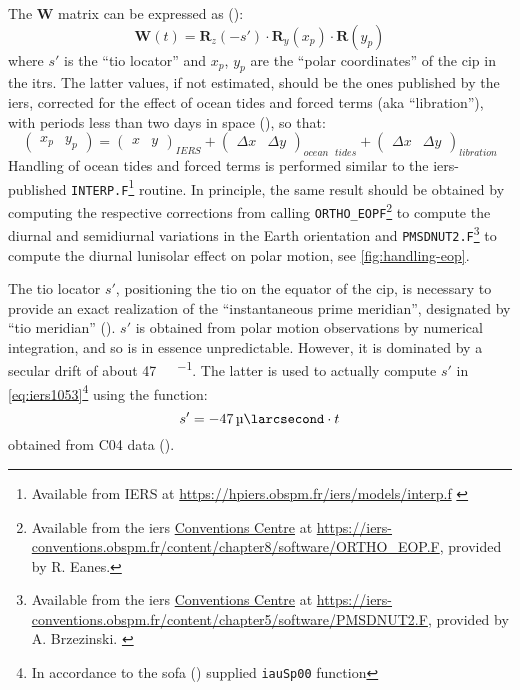 The $\bm{W}$ matrix can be expressed as (\cite{iers2010}):
\begin{equation}
    \bm{W}(t) = \bm{R}_z(-s') \cdot \bm{R}_y(x_p) \cdot \bm{R}(y_p)
    \label{eq:iers1053}
\end{equation}
where $s'$ is the ``\gls{tio} locator'' and $x_p$, $y_p$ are the 
``polar coordinates'' of the \gls{cip} in the \gls{itrs}. The latter values, 
if not estimated, should be the ones published by the \gls{iers}, corrected for 
the effect of ocean tides and forced terms (aka ``libration''), with periods 
less than two days in space (\cite{iers2010}), so that:
\begin{equation}
    \begin{pmatrix} x_p & y_p \end{pmatrix} = 
    \begin{pmatrix} x & y \end{pmatrix}_{IERS} + 
    \begin{pmatrix} \Delta x & \Delta y \end{pmatrix}_{ocean\text{ }tides} + 
    \begin{pmatrix} \Delta x & \Delta y \end{pmatrix}_{libration} 
\end{equation}
Handling of ocean tides and forced terms is performed similar to the \gls{iers}-published 
\texttt{INTERP.F}\footnote{Available from IERS at \url{https://hpiers.obspm.fr/iers/models/interp.f} \label{fn:interp-f}} routine. 
In principle, the same result should be obtained by computing the respective 
corrections from calling \texttt{ORTHO\_EOPF}\footnote{Available from the \gls{iers} \href{https://iers-conventions.obspm.fr/}{Conventions Centre} at \url{https://iers-conventions.obspm.fr/content/chapter8/software/ORTHO_EOP.F}, provided by R. Eanes.\label{fn:ortho-eop-f}} 
to compute the diurnal and semidiurnal variations in the Earth orientation
and \texttt{PMSDNUT2.F}\footnote{Available from the \gls{iers} \href{https://iers-conventions.obspm.fr/}{Conventions Centre} at \url{https://iers-conventions.obspm.fr/content/chapter5/software/PMSDNUT2.F}, provided by A. Brzezinski. \label{fn:pmsdnut2-f}}
to compute the diurnal lunisolar effect on polar motion, see \ref{fig:handling-eop}.

The \gls{tio} locator $s'$, positioning the \gls{tio} on the equator of the \gls{cip}, 
is necessary to provide an exact realization of the ``instantaneous prime meridian'', 
designated by ``\gls{tio} meridian'' (\cite{iers2010}). $s'$ is obtained from 
polar motion observations by numerical integration, and so is in essence 
unpredictable. However, it is dominated by a secular drift of about 
\SI{47}{\micro\larcsecond \per \century}. The latter is used to actually compute 
$s'$ in \ref{eq:iers1053}\footnote{In accordance to the \gls{sofa} (\cite{SOFA20210125}) supplied \texttt{iauSp00} function} 
using the function:
\begin{equation}
  s' = \SI{-47}{\micro\larcsecond} \cdot t
  \label{eq:iers10513}
\end{equation}
obtained from C04 data (\cite{Lambert_2002}).

